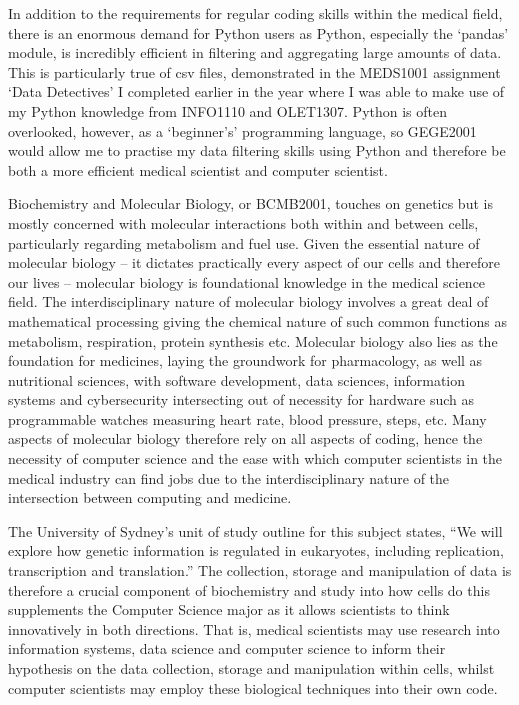 In addition to the requirements for regular coding skills within the medical field, there is an enormous demand for Python users as Python, especially the ‘pandas’ module, is incredibly efficient in filtering and aggregating large amounts of data. This is particularly true of csv files, demonstrated in the MEDS1001 assignment ‘Data Detectives’ I completed earlier in the year where I was able to make use of my Python knowledge from INFO1110 and OLET1307. Python is often overlooked, however, as a ‘beginner’s’ programming language, so GEGE2001 would allow me to practise my data filtering skills using Python and therefore be both a more efficient medical scientist and computer scientist.

Biochemistry and Molecular Biology, or BCMB2001, touches on genetics but is mostly concerned with molecular interactions both within and between cells, particularly regarding metabolism and fuel use. Given the essential nature of molecular biology – it dictates practically every aspect of our cells and therefore our lives – molecular biology is foundational knowledge in the medical science field. The interdisciplinary nature of molecular biology involves a great deal of mathematical processing giving the chemical nature of such common functions as metabolism, respiration, protein synthesis etc. Molecular biology also lies as the foundation for medicines, laying the groundwork for pharmacology, as well as nutritional sciences, with software development, data sciences, information systems and cybersecurity intersecting out of necessity for hardware such as programmable watches measuring heart rate, blood pressure, steps, etc. Many aspects of molecular biology therefore rely on all aspects of coding, hence the necessity of computer science and the ease with which computer scientists in the medical industry can find jobs due to the interdisciplinary nature of the intersection between computing and medicine.

The University of Sydney’s unit of study outline for this subject states, “We will explore how genetic information is regulated in eukaryotes, including replication, transcription and translation.” The collection, storage and manipulation of data is therefore a crucial component of biochemistry and study into how cells do this supplements the Computer Science major as it allows scientists to think innovatively in both directions. That is, medical scientists may use research into information systems, data science and computer science to inform their hypothesis on the data collection, storage and manipulation within cells, whilst computer scientists may employ these biological techniques into their own code.

